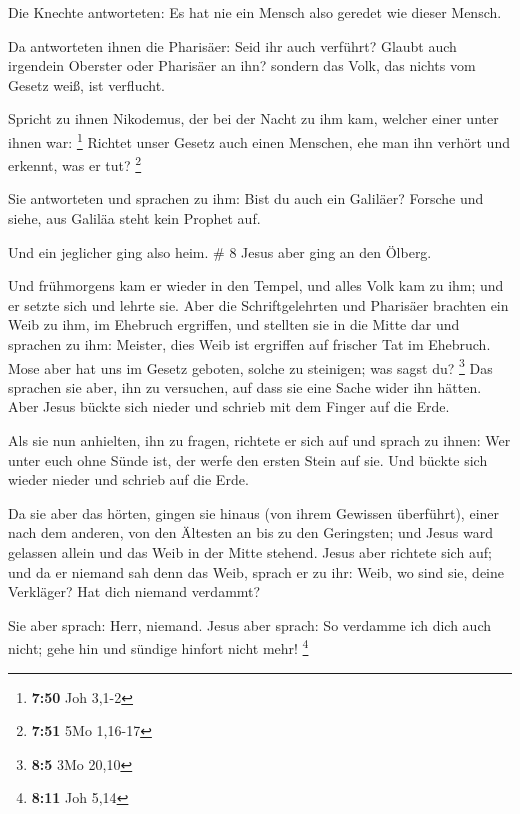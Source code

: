  Die Knechte antworteten: Es hat nie ein Mensch also
geredet wie dieser Mensch.

 Da antworteten ihnen die Pharisäer: Seid ihr auch
verführt?  Glaubt auch irgendein Oberster oder Pharisäer
an ihn?  sondern das Volk, das nichts vom Gesetz weiß,
ist verflucht.

 Spricht zu ihnen Nikodemus, der bei der Nacht zu ihm
kam, welcher einer unter ihnen war: \footnote{\textbf{7:50} Joh 3,1-2}
 Richtet unser Gesetz auch einen Menschen, ehe man ihn
verhört und erkennt, was er tut? \footnote{\textbf{7:51} 5Mo 1,16-17}

 Sie antworteten und sprachen zu ihm: Bist du auch ein
Galiläer? Forsche und siehe, aus Galiläa steht kein Prophet auf.

 Und ein jeglicher ging also heim. \# 8 
Jesus aber ging an den Ölberg.

 Und frühmorgens kam er wieder in den Tempel, und alles
Volk kam zu ihm; und er setzte sich und lehrte sie.  Aber
die Schriftgelehrten und Pharisäer brachten ein Weib zu ihm, im Ehebruch
ergriffen, und stellten sie in die Mitte dar  und sprachen
zu ihm: Meister, dies Weib ist ergriffen auf frischer Tat im Ehebruch.
 Mose aber hat uns im Gesetz geboten, solche zu steinigen;
was sagst du? \footnote{\textbf{8:5} 3Mo 20,10}  Das
sprachen sie aber, ihn zu versuchen, auf dass sie eine Sache wider ihn
hätten. Aber Jesus bückte sich nieder und schrieb mit dem Finger auf die
Erde.

 Als sie nun anhielten, ihn zu fragen, richtete er sich
auf und sprach zu ihnen: Wer unter euch ohne Sünde ist, der werfe den
ersten Stein auf sie.  Und bückte sich wieder nieder und
schrieb auf die Erde.

 Da sie aber das hörten, gingen sie hinaus (von ihrem
Gewissen überführt), einer nach dem anderen, von den Ältesten an bis zu
den Geringsten; und Jesus ward gelassen allein und das Weib in der Mitte
stehend.  Jesus aber richtete sich auf; und da er niemand
sah denn das Weib, sprach er zu ihr: Weib, wo sind sie, deine Verkläger?
Hat dich niemand verdammt?

 Sie aber sprach: Herr, niemand. Jesus aber sprach: So
verdamme ich dich auch nicht; gehe hin und sündige hinfort nicht mehr!
\footnote{\textbf{8:11} Joh 5,14}


